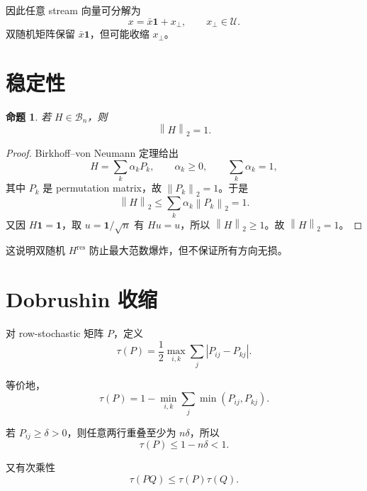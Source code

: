 \documentclass[UTF8,11pt]{ctexart}
\newtheorem{proposition}{命题}
\newcommand{\one}{\mathbf{1}}
\newcommand{\Birkhoff}{\mathcal{B}_n}
\newcommand{\Hres}{H^{\mathrm{res}}}
\newcommand{\norm}[1]{\left\lVert #1 \right\rVert}
\begin{document}
因此任意 stream 向量可分解为
\begin{equation}
  x = \bar{x}\one + x_\perp,
  \qquad
  x_\perp\in\mathcal{U}.
\end{equation}
双随机矩阵保留 $\bar{x}\one$，但可能收缩 $x_\perp$。

\section{稳定性}

\begin{proposition}
若 $H\in\Birkhoff$，则
\begin{equation}
  \norm{H}_2=1.
\end{equation}
\end{proposition}

\begin{proof}
Birkhoff--von Neumann 定理给出
\begin{equation}
  H=\sum_k \alpha_k P_k,
  \qquad
  \alpha_k\ge 0,
  \qquad
  \sum_k\alpha_k=1,
\end{equation}
其中 $P_k$ 是 permutation matrix，故 $\norm{P_k}_2=1$。于是
\begin{equation}
  \norm{H}_2
  \le
  \sum_k\alpha_k\norm{P_k}_2
  =1.
\end{equation}
又因 $H\one=\one$，取 $u=\one/\sqrt n$ 有 $Hu=u$，所以 $\norm{H}_2\ge1$。故 $\norm{H}_2=1$。
\end{proof}

这说明双随机 $\Hres$ 防止最大范数爆炸，但不保证所有方向无损。

\section{Dobrushin 收缩}

对 row-stochastic 矩阵 $P$，定义
\begin{equation}
  \tau(P)
  =
  \frac12\max_{i,k}\sum_j |P_{ij}-P_{kj}|.
\end{equation}

等价地，
\begin{equation}
  \tau(P)
  =
  1-
  \min_{i,k}\sum_j \min(P_{ij},P_{kj}).
\end{equation}

若 $P_{ij}\ge\delta>0$，则任意两行重叠至少为 $n\delta$，所以
\begin{equation}
  \tau(P)\le 1-n\delta<1.
\end{equation}

又有次乘性
\begin{equation}
  \tau(PQ)\le \tau(P)\tau(Q).
\end{equation}
\end{document}
